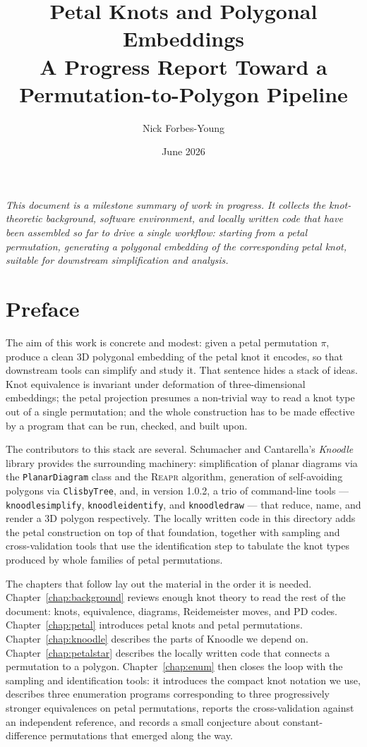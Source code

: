 \documentclass[11pt,oneside]{report}
\title{\Huge\bfseries Petal Knots and Polygonal Embeddings\\[0.6em]
\large A Progress Report Toward a\\ Permutation-to-Polygon Pipeline}
\author{Nick Forbes-Young}
\date{June 2026}
\theoremstyle{definition}
\begin{document}
\frontmatter
{}
\maketitle

\thispagestyle{empty}
\vfill
\noindent
\textit{This document is a milestone summary of work in progress. It collects
the knot-theoretic background, software environment, and locally written code
that have been assembled so far to drive a single workflow: starting from a
petal permutation, generating a polygonal embedding of the corresponding petal
knot, suitable for downstream simplification and analysis.}
\vfill

\tableofcontents

\chapter*{Preface}

The aim of this work is concrete and modest: given a petal permutation $\pi$,
produce a clean 3D polygonal embedding of the petal knot it encodes, so that
downstream tools can simplify and study it. That sentence hides a stack of
ideas. Knot equivalence is invariant under deformation of three-dimensional
embeddings; the petal projection presumes a non-trivial way to read a knot
type out of a single permutation; and the whole construction has to be made
effective by a program that can be run, checked, and built upon.

The contributors to this stack are several. Schumacher and Cantarella's
\emph{Knoodle} library provides the surrounding machinery: simplification of
planar diagrams via the \texttt{PlanarDiagram} class and the \textsc{Reapr}
algorithm, generation of self-avoiding polygons via \texttt{ClisbyTree}, and,
in version 1.0.2, a trio of command-line tools --- \texttt{knoodlesimplify},
\texttt{knoodleidentify}, and \texttt{knoodledraw} --- that reduce, name, and
render a 3D polygon respectively. The locally written code in this directory
adds the petal construction on top of that foundation, together with
sampling and cross-validation tools that use the identification step to
tabulate the knot types produced by whole families of petal permutations.

The chapters that follow lay out the material in the order it is needed.
Chapter~\ref{chap:background} reviews enough knot theory to read the rest of
the document: knots, equivalence, diagrams, Reidemeister moves, and PD codes.
Chapter~\ref{chap:petal} introduces petal knots and petal permutations.
Chapter~\ref{chap:knoodle} describes the parts of Knoodle we depend on.
Chapter~\ref{chap:petalstar} describes the locally written code that
connects a permutation to a polygon. Chapter~\ref{chap:enum} then closes the
loop with the sampling and identification tools: it introduces the compact
knot notation we use, describes three enumeration programs corresponding to
three progressively stronger equivalences on petal permutations, reports the
cross-validation against an independent reference, and records a small
conjecture about constant-difference permutations that emerged along the way.
\end{document}
